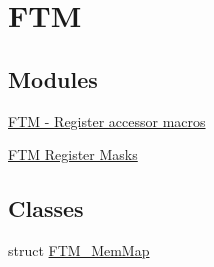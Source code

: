 \hypertarget{group___f_t_m___peripheral}{}\section{F\+TM}
\label{group___f_t_m___peripheral}
\subsection*{Modules}
\begin{DoxyCompactItemize}
\item 
\hyperlink{group___f_t_m___register___accessor___macros}{F\+T\+M -\/ Register accessor macros}
\item 
\hyperlink{group___f_t_m___register___masks}{F\+T\+M Register Masks}
\end{DoxyCompactItemize}
\subsection*{Classes}
\begin{DoxyCompactItemize}
\item 
struct \hyperlink{struct_f_t_m___mem_map}{F\+T\+M\+\_\+\+Mem\+Map}
\end{DoxyCompactItemize}
